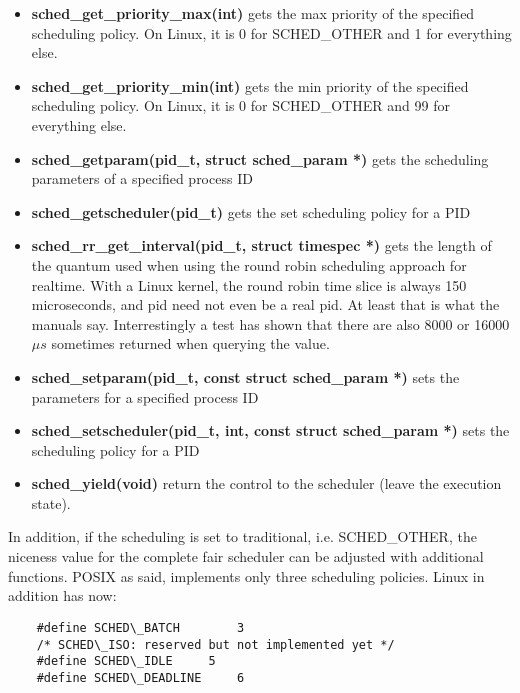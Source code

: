 \documentclass[]{scrartcl}
\begin{document}
\begin{itemize}
	\item \textbf{sched\_get\_priority\_max(int)}
		gets the max priority of the specified scheduling policy. On Linux, it is 0 for SCHED\_OTHER and 1 for everything else. 
	
	\item \textbf{sched\_get\_priority\_min(int)}
		gets the min priority of the specified scheduling policy. On Linux, it is 0 for SCHED\_OTHER and 99 for everything else. 
		
	\item \textbf{sched\_getparam(pid\_t, struct sched\_param *)}
		gets the scheduling parameters of a specified process ID
	
	\item \textbf{sched\_getscheduler(pid\_t)}
		gets the set scheduling policy for a PID
	
	\item \textbf{sched\_rr\_get\_interval(pid\_t, struct timespec *)}
		gets the length of the quantum used when using the round robin scheduling approach for realtime.
		With a Linux kernel, the round robin time slice is always 150 microseconds, and pid need not even be a real pid. At least that is what the manuals say. Interrestingly a test has shown that there are also 8000 or 16000 $\mu s$ sometimes returned when querying the value.
	
	\item \textbf{sched\_setparam(pid\_t, const struct sched\_param *)}
		sets the parameters for a specified process ID
	
	\item \textbf{sched\_setscheduler(pid\_t, int, const struct sched\_param *)}
		sets the scheduling policy for a PID
	
	\item \textbf{sched\_yield(void)}
		return the control to the scheduler (leave the execution state).
\end{itemize}

In addition, if the scheduling is set to traditional, i.e. SCHED\_OTHER, the niceness value for the complete fair scheduler can be adjusted with additional functions. 
POSIX as said, implements only three scheduling policies.
Linux in addition has now:

\begin{verbatim}
    #define SCHED\_BATCH		3
    /* SCHED\_ISO: reserved but not implemented yet */
    #define SCHED\_IDLE		5
    #define SCHED\_DEADLINE		6
\end{verbatim}
\end{document}

